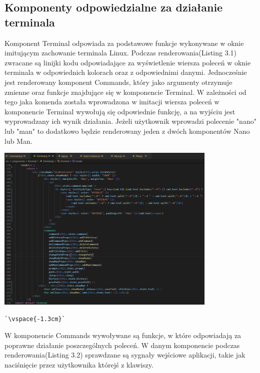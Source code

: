 \documentclass[10pt,a4paper]{report}
\begin{document}
\begin{adjustwidth}{2cm}{2cm}
\subsection{Komponenty odpowiedzialne za działanie terminala}
\begin{minipage}{1\linewidth}
Komponent Terminal odpowiada za podstawowe funkcje wykonywane w oknie imitującym zachowanie terminala Linux. Podczas renderowania(Listing 3.1) zwracane są linijki kodu odpowiadające za wyświetlenie wiersza poleceń w oknie terminala w odpowiednich kolorach oraz z odpowiednimi danymi. Jednocześnie jest renderowany komponent Commands, który jako argumenty otrzymuje zmienne oraz funkcje znajdujące się w komponencie Terminal. W zależności od  tego jaka komenda została wprowadzona w imitacji  wiersza poleceń w komponencie Terminal wywołują się odpowiednie funkcję, a na wyjściu jest wyprowadzany ich wynik działania. Jeżeli użytkownik wprowadzi polecenie "nano" lub "man" to dodatkowo będzie renderowany jeden z dwóch komponentów Nano lub Man.
\end{minipage}
\vspace{0.3cm}
\begin{center}
\includegraphics[width=400px]{code/term_code.png} 
\begin{lstlisting}[escapeinside=``,caption={Renderowanie w komponencie Terminal}]
`\vspace{-1.3cm}`
\end{lstlisting}
\end{center}
\vspace{0.3cm}
\begin{minipage}{1\linewidth}
W komponencie Commands wywoływane są funkcje, w które odpowiadają za poprawne działanie poszczególnych poleceń. W danym komponencie podczas renderowania(Listing 3.2) sprawdzane są sygnały wejściowe aplikacji, takie jak  naciśnięcie przez użytkownika którejś z klawiszy.

\end{minipage}
\end{adjustwidth}
\end{document}
